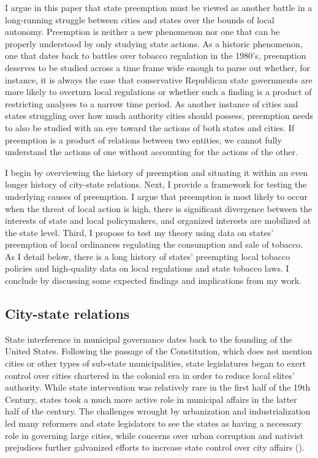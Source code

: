 \documentclass[12pt]{article}
\begin{document}
I argue in this paper that state preemption must be viewed as another battle in a long-running struggle between cities and states over the bounds of local autonomy. Preemption is neither a new phenomenon nor one that can be properly understood by only studying state actions. As a historic phenomenon, one that dates back to battles over tobacco regulation in the 1980's, preemption deserves to be studied across a time frame wide enough to parse out whether, for instance, it is always the case that conservative Republican state governments are more likely to overturn local regulations or whether such a finding is a product of restricting analyses to a narrow time period. As another instance of cities and states struggling over how much authority cities should possess, preemption needs to also be studied with an eye toward the actions of both states and cities. If preemption is a product of relations between two entities, we cannot fully understand the actions of one without accounting for the actions of the other.

I begin by overviewing the history of preemption and situating it within an even longer history of city-state relations. Next, I provide a framework for testing the underlying causes of preemption. I argue that preemption is most likely to occur when the threat of local action is high, there is significant divergence between the interests of state and local policymakers, and organized interests are mobilized at the state level. Third, I propose to test my theory using data on states' preemption of local ordinances regulating the consumption and sale of tobacco. As I detail below, there is a long history of states' preempting local tobacco policies and high-quality data on local regulations and state tobacco laws. I conclude by discussing some expected findings and implications from my work. 

\subsection*{City-state relations}
State interference in municipal governance dates back to the founding of the United States. Following the passage of the Constitution, which does not mention cities or other types of sub-state municipalities, state legislatures began to exert control over cities chartered in the colonial era in order to reduce local elites' authority. While state intervention was relatively rare in the first half of the 19th Century, states took a much more active role in municipal affairs in the latter half of the century. The challenges wrought by urbanization and industrialization led many reformers and state legislators to see the states as having a necessary role in governing large cities, while concerns over urban corruption and nativist prejudices further galvanized efforts to increase state control over city affairs (\cites[p. 53-57]{bermanLocalGovernmentStates2003}[p. 9]{kraneHomeRuleAmerica2000}). 
\end{document}
